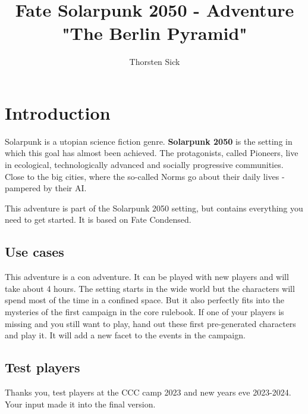 \documentclass{book}
\title{Fate Solarpunk 2050 - Adventure "The Berlin Pyramid"}
\author{Thorsten Sick}
\begin{document}
%
%
\mbox{}
\thispagestyle{empty}
\BgThispage


\chapter{Introduction}

Solarpunk is a utopian science fiction genre. \textbf{Solarpunk 2050} is the setting in which this goal has almost been achieved. The protagonists, called Pioneers, live in ecological, technologically advanced and socially progressive communities. Close to the big cities, where the so-called Norms go about their daily lives - pampered by their AI.

This adventure is part of the Solarpunk 2050 setting, but contains everything you need to get started. It is based on Fate Condensed.

\section{Use cases}

This adventure is a con adventure. It can be played with new players and will take about 4 hours. The setting starts in the wide world but the characters will spend most of the time in a confined space. But it also perfectly fits into the mysteries of the first campaign in the core rulebook. If one of your players is missing and you still want to play, hand out these first pre-generated characters and play it. It will add a new facet to the events in the campaign.

\section{Test players}

Thanks you, test players at the CCC camp 2023 and new years eve 2023-2024. Your input made it into the final version.




\end{document}
